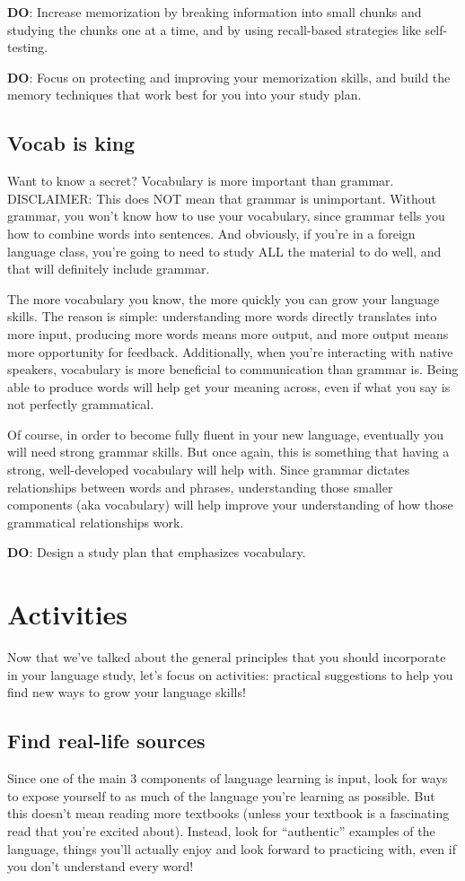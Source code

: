 \documentclass[../main.tex]{subfiles}
\begin{document}
\textbf{DO}: Increase memorization by breaking information into small chunks and
studying the chunks one at a time, and by using recall-based strategies like
self-testing.

\textbf{DO}: Focus on protecting and improving your memorization skills, and
build the memory techniques that work best for you into your study plan.
%
\subsection{Vocab is king}
Want to know a secret? Vocabulary is more important than grammar.
DISCLAIMER: This does NOT mean that grammar is unimportant. Without grammar, you
won’t know how to use your vocabulary, since grammar tells you how to combine
words into sentences. And obviously, if you’re in a foreign language class,
you’re going to need to study ALL the material to do well, and that will
definitely include grammar.

The more vocabulary you know, the more quickly you can grow your language
skills. The reason is simple: understanding more words directly translates into
more input, producing more words means more output, and more output means more
opportunity for feedback. Additionally, when you’re interacting with native
speakers, vocabulary is more beneficial to communication than grammar is. Being
able to produce words will help get your meaning across, even if what you say is
not perfectly grammatical.

Of course, in order to become fully fluent in your new language, eventually you
will need strong grammar skills. But once again, this is something that having a
strong, well-developed vocabulary will help with. Since grammar dictates
relationships between words and phrases, understanding those smaller components
(aka vocabulary) will help improve your understanding of how those grammatical
relationships work.

\textbf{DO}: Design a study plan that emphasizes vocabulary.
%
\section{Activities}
Now that we’ve talked about the general principles that you should incorporate
in your language study, let’s focus on activities: practical suggestions to help
you find new ways to grow your language skills!
%
\subsection{Find real-life sources}
Since one of the main 3 components of language learning is input, look for ways
to expose yourself to as much of the language you’re learning as possible. But
this doesn’t mean reading more textbooks (unless your textbook is a fascinating
read that you’re excited about). Instead, look for “authentic” examples of the
language, things you’ll actually enjoy and look forward to practicing with, even
if you don’t understand every word!
\end{document}
